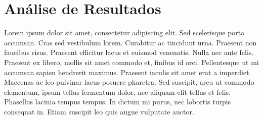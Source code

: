 \chapter{Análise de Resultados}
\label{cap-resultados}
Lorem ipsum dolor sit amet, consectetur adipiscing elit. Sed scelerisque porta accumsan. Cras sed vestibulum lorem. Curabitur ac tincidunt urna. Praesent non faucibus risus. Praesent efficitur lacus et euismod venenatis. Nulla nec ante felis. Praesent ex libero, mollis sit amet commodo et, finibus id orci. Pellentesque ut mi accumsan sapien hendrerit maximus. Praesent iaculis sit amet erat a imperdiet. Maecenas ac leo pulvinar lacus posuere pharetra. Sed suscipit, arcu ut commodo elementum, ipsum tellus fermentum dolor, nec aliquam elit tellus et felis. Phasellus lacinia tempus tempus. In dictum mi purus, nec lobortis turpis consequat in. Etiam suscipit leo quis augue vulputate auctor.

